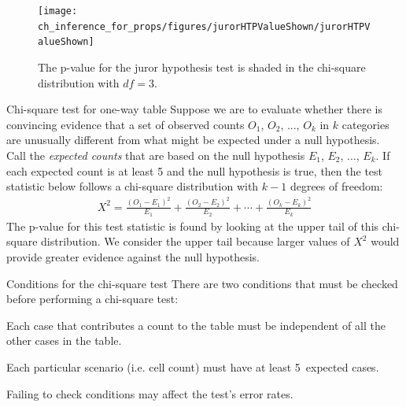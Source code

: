 \begin{figure}[h]
\centering
\texttt{[image: ch\_inference\_for\_props/figures/jurorHTPValueShown/jurorHTPValueShown]}
\caption{The p-value for the juror hypothesis test is shaded in the chi-square distribution with $df=3$.}
\label{jurorHTPValueShown}
\end{figure}


\begin{onebox}{Chi-square test for one-way table}
  Suppose we are to evaluate whether there is convincing
  evidence that a set of observed counts $O_1$, $O_2$, ...,
  $O_k$ in $k$ categories are unusually different from what
  might be expected under a null hypothesis.
  Call the \emph{expected counts} that are based on the null
  hypothesis $E_1$, $E_2$, ..., $E_k$.
  If each expected count is at least 5 and the null hypothesis
  is true, then the test statistic below follows a chi-square
  distribution with $k-1$ degrees of freedom:
  \begin{align*}
  X^2
    = \frac{(O_1 - E_1)^2}{E_1} +
        \frac{(O_2 - E_2)^2}{E_2} +
        \cdots +
        \frac{(O_k - E_k)^2}{E_k}
  \end{align*}
  The p-value for this test statistic is found by looking
  at the upper tail of this chi-square distribution.
  We consider the upper tail because larger values of $X^2$
  would provide greater evidence against the null hypothesis.
\end{onebox}

\begin{onebox}{Conditions for the chi-square test}
  There are two conditions that must be checked before
  performing a chi-square test:\vspace{-1mm}
  \begin{description}
  \setlength{\itemsep}{0mm}
  \item[Independence.] Each case that contributes a count to
      the table must be independent of all the other cases in
      the table.
  \item[Sample size / distribution.] Each particular scenario
      (i.e. cell count) must have at least 5~expected cases.
  \end{description}
  Failing to check conditions may affect the test's error rates.
\end{onebox}

